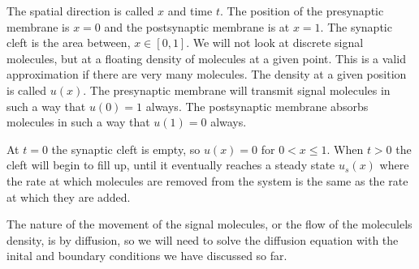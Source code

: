 The spatial direction is called $x$ and time $t$. The position of
the presynaptic membrane is $x=0$ and the postsynaptic membrane is
at $x=1$. The synaptic cleft is the area between, $x \in [0,1]$. We
will not look at discrete signal molecules, but at a floating
density of molecules at a given point. This is a valid
approximation if there are very many molecules. The density at a
given position is called $u(x)$. The presynaptic membrane will
transmit signal molecules in such a way that $u(0)=1$ always. The
postsynaptic membrane absorbs molecules in such a way that $u(1)=0$
always.

At $t=0$ the synaptic cleft is empty, so $u(x)=0$  for $0 < x \leq
1$. When $t > 0$ the cleft will begin to fill up, until it
eventually reaches a steady state $u_s(x)$ where the rate at which molecules
are removed from the system is the same as the rate at which they
are added.

The nature of the movement of the signal molecules, or the flow of the 
moleculels density, is by diffusion, so we will need to solve the diffusion 
equation with the inital and boundary conditions we have discussed so far.